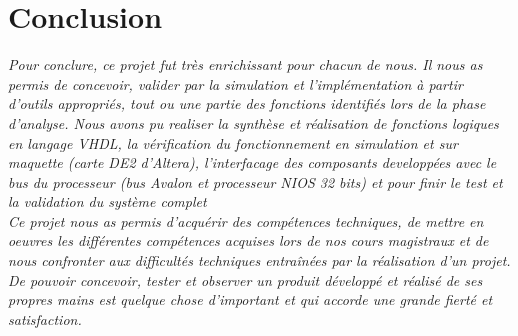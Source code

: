 \section{Conclusion}

\textit{Pour conclure, ce projet fut très enrichissant pour chacun de nous. Il nous as permis de concevoir, valider par la simulation et l’implémentation à partir d’outils appropriés, tout ou une partie des fonctions identifiés lors de la phase d'analyse. Nous avons pu realiser la synthèse et réalisation de fonctions logiques en langage VHDL, la vérification du fonctionnement en simulation et sur maquette (carte DE2 d’Altera), l’interfacage des composants developpées avec le bus du processeur (bus Avalon et processeur NIOS 32 bits) et pour finir le test et la validation du système complet}\newline
\\

\textit{Ce projet nous as permis d'acquérir des compétences techniques, de mettre en oeuvres les différentes compétences acquises lors de nos cours magistraux et de nous confronter aux difficultés techniques entraînées par la réalisation d'un projet. De pouvoir concevoir, tester et observer un produit développé et réalisé de ses propres mains est quelque chose d'important et qui accorde une grande fierté et satisfaction.}